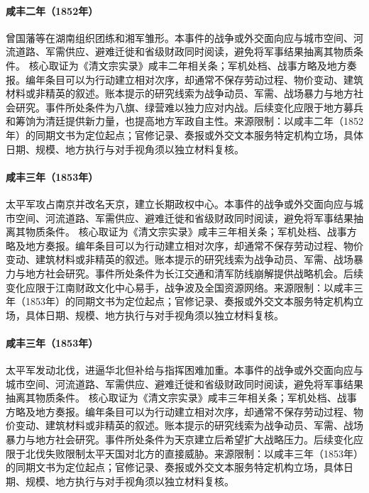 \hypertarget{civic:EQ-1852-HUNAN-ARMY-ORIGINS}{}\paragraph{咸丰二年（1852年）}曾国藩等在湖南组织团练和湘军雏形。本事件的战争或外交面向应与城市空间、河流道路、军需供应、避难迁徙和省级财政同时阅读，避免将军事结果抽离其物质条件。 核心取证为《清文宗实录》咸丰二年相关条；军机处档、战事方略及地方奏报。编年条目可以为行动建立相对次序，却通常不保存劳动过程、物价变动、建筑材料或非精英的叙述。账本提示的研究线索为战争动员、军需、战场暴力与地方社会研究。事件所处条件为八旗、绿营难以独力应对内战。后续变化应限于地方募兵和筹饷为清廷提供新力量，也提高地方军政自主性。来源限制：以咸丰二年（1852年）的同期文书为定位起点；官修记录、奏报或外交文本服务特定机构立场，具体日期、规模、地方执行与对手视角须以独立材料复核。
\hypertarget{civic:EQ-1853-NANJING-TAKING}{}\paragraph{咸丰三年（1853年）}太平军攻占南京并改名天京，建立长期政权中心。本事件的战争或外交面向应与城市空间、河流道路、军需供应、避难迁徙和省级财政同时阅读，避免将军事结果抽离其物质条件。 核心取证为《清文宗实录》咸丰三年相关条；军机处档、战事方略及地方奏报。编年条目可以为行动建立相对次序，却通常不保存劳动过程、物价变动、建筑材料或非精英的叙述。账本提示的研究线索为战争动员、军需、战场暴力与地方社会研究。事件所处条件为长江交通和清军防线崩解提供战略机会。后续变化应限于江南财政文化中心易手，战争波及全国资源网络。来源限制：以咸丰三年（1853年）的同期文书为定位起点；官修记录、奏报或外交文本服务特定机构立场，具体日期、规模、地方执行与对手视角须以独立材料复核。
\hypertarget{civic:EQ-1853-NORTHERN-EXPEDITION}{}\paragraph{咸丰三年（1853年）}太平军发动北伐，进逼华北但补给与指挥困难加重。本事件的战争或外交面向应与城市空间、河流道路、军需供应、避难迁徙和省级财政同时阅读，避免将军事结果抽离其物质条件。 核心取证为《清文宗实录》咸丰三年相关条；军机处档、战事方略及地方奏报。编年条目可以为行动建立相对次序，却通常不保存劳动过程、物价变动、建筑材料或非精英的叙述。账本提示的研究线索为战争动员、军需、战场暴力与地方社会研究。事件所处条件为天京建立后希望扩大战略压力。后续变化应限于北伐失败限制太平天国对北方的直接威胁。来源限制：以咸丰三年（1853年）的同期文书为定位起点；官修记录、奏报或外交文本服务特定机构立场，具体日期、规模、地方执行与对手视角须以独立材料复核。
